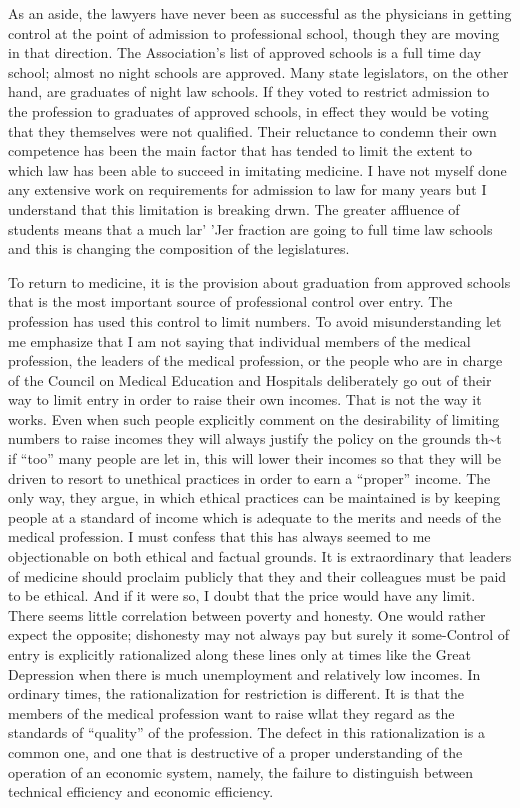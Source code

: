\documentclass[11pt,openany]{book}
\begin{document}
As an aside, the lawyers have never been as successful as the physicians in getting control at the point of admission to professional school, though they are moving in that direction. The Association's list of approved schools is a full time day school; almost no night schools are approved. Many state legislators, on the other hand, are graduates of night law schools. If they voted to restrict admission to the profession to graduates of approved schools, in effect they would be voting that they themselves were not qualified. Their reluctance to condemn their own competence has been the main factor that has tended to limit the extent to which law has been able to succeed in imitating medicine. I have not myself done any extensive work on requirements for admission to law for many years but I understand that this limitation is breaking drwn. The greater affluence of students means that a much lar' 'Jer fraction are going to full time law schools and this is changing the composition of the legislatures.

To return to medicine, it is the provision about graduation from approved schools that is the most important source of professional control over entry. The profession has used this control to limit numbers. To avoid misunderstanding let me emphasize that I am not saying that individual members of the medical profession, the leaders of the medical profession, or the people who are in charge of the Council on Medical Education and Hospitals deliberately go out of their way to limit entry in order to raise their own incomes. That is not the way it works. Even when such people explicitly comment on the desirability of limiting numbers to raise incomes they will always justify the policy on the grounds th\textasciitilde{}t if ``too'' many people are let in, this will lower their incomes so that they will be driven to resort to unethical practices in order to earn a ``proper'' income. The only way, they argue, in which ethical practices can be maintained is by keeping people at a standard of income which is adequate to the merits and needs of the medical profession. I must confess that this has always seemed to me objectionable on both ethical and factual grounds. It is extraordinary that leaders of medicine should proclaim publicly that they and their colleagues must be paid to be ethical. And if it were so, I doubt that the price would have any limit. There seems little correlation between poverty and honesty. One would rather expect the opposite; dishonesty may not always pay but surely it some-Control of entry is explicitly rationalized along these lines only at times like the Great Depression when there is much unemployment and relatively low incomes. In ordinary times, the rationalization for restriction is different. It is that the members of the medical profession want to raise wllat they regard as the standards of ``quality'' of the profession. The defect in this rationalization is a common one, and one that is destructive of a proper understanding of the operation of an economic system, namely, the failure to distinguish between technical efficiency and economic efficiency.
\end{document}
